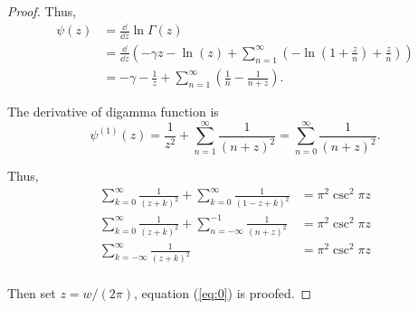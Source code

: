 \documentclass{article}
\theoremstyle{plain}
\begin{document}
\begin{proof}
Thus,
\begin{align*}
\psi(z) &= \frac{\dd}{\dd z} \ln\Gamma(z) \\
&= \frac{\dd}{\dd z} \left(  -\gamma z - \ln(z) + 
\sum_{n=1}^{\infty} \left(-\ln(1+\frac{z}{n}) + \frac{z}{n}\right)  \right) \\
&= -\gamma - \frac{1}{z} + \sum_{n=1}^{\infty} \left( \frac{1}{n} - \frac{1}{n+z} \right) .
\end{align*}

The derivative of digamma function is
\begin{equation}
\psi^{(1)}(z) = \frac{1}{z^2} + \sum_{n=1}^{\infty} \frac{1}{(n+z)^2} = \sum_{n=0}^{\infty} \frac{1}{(n+z)^2}.
\end{equation}

Thus,
\begin{align*}
\sum_{k=0}^{\infty} \frac{1}{(z+k)^2} + \sum_{k=0}^{\infty} \frac{1}{(1-z+k)^2} &= \pi^2 \csc^2 \pi z \\
\sum_{k=0}^{\infty} \frac{1}{(z+k)^2} + \sum_{n=-\infty}^{-1} \frac{1}{(n+z)^2} &= \pi^2 \csc^2 \pi z \\
\sum_{k=-\infty}^{\infty} \frac{1}{(z+k)^2} &= \pi^2 \csc^2 \pi z \\
\end{align*}

Then set $z = w / (2\pi)$, equation (\ref{eq:0}) is proofed.
\end{proof}
\end{document}
